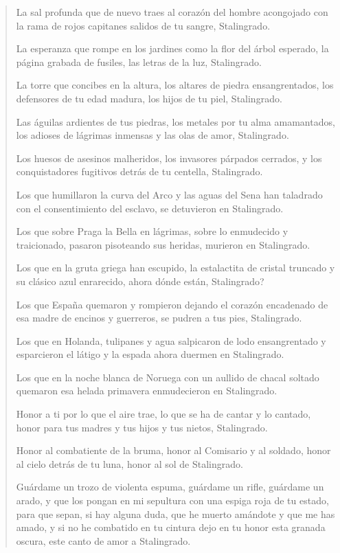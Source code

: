 \documentclass[12pt]{article}
\begin{document}
\begin{verse}
La sal profunda que de nuevo traes  
al corazón del hombre acongojado  
con la rama de rojos capitanes  
	salidos de tu sangre, Stalingrado.  
	
La esperanza que rompe en los jardines  
como la flor del árbol esperado,  
la página grabada de fusiles,  
	las letras de la luz, Stalingrado.  
	
La torre que concibes en la altura,  
los altares de piedra ensangrentados,  
los defensores de tu edad madura,  
	los hijos de tu piel, Stalingrado.  
	
Las águilas ardientes de tus piedras,  
los metales por tu alma amamantados,  
los adioses de lágrimas inmensas  
	y las olas de amor, Stalingrado.  
	
Los huesos de asesinos malheridos,  
los invasores párpados cerrados,  
y los conquistadores fugitivos  
	detrás de tu centella, Stalingrado.  
	
Los que humillaron la curva del Arco  
y las aguas del Sena han taladrado  
con el consentimiento del esclavo,  
	se detuvieron en Stalingrado.  
	
Los que sobre Praga la Bella en lágrimas,  
sobre lo enmudecido y traicionado,  
pasaron pisoteando sus heridas,  
	murieron en Stalingrado.  
	
Los que en la gruta griega han escupido,  
la estalactita de cristal truncado  
y su clásico azul enrarecido,  
	ahora dónde están, Stalingrado?  
	
Los que España quemaron y rompieron  
dejando el corazón encadenado  
de esa madre de encinos y guerreros,  
	se pudren a tus pies, Stalingrado.  
	
Los que en Holanda, tulipanes y agua  
salpicaron de lodo ensangrentado  
y esparcieron el látigo y la espada  
	ahora duermen en Stalingrado.  
	
Los que en la noche blanca de Noruega  
con un aullido de chacal soltado  
quemaron esa helada primavera  
	enmudecieron en Stalingrado.  
	
Honor a ti por lo que el aire trae,  
lo que se ha de cantar y lo cantado,  
honor para tus madres y tus hijos  
	y tus nietos, Stalingrado.  
	
Honor al combatiente de la bruma,  
honor al Comisario y al soldado,  
honor al cielo detrás de tu luna,  
	honor al sol de Stalingrado.  
	
Guárdame un trozo de violenta espuma,  
guárdame un rifle, guárdame un arado,  
y que los pongan en mi sepultura  
con una espiga roja de tu estado,  
para que sepan, si hay alguna duda,  
que he muerto amándote y que me has amado,  
y si no he combatido en tu cintura  
dejo en tu honor esta granada oscura,  
	este canto de amor a Stalingrado.  

\end{verse}
\end{document}
